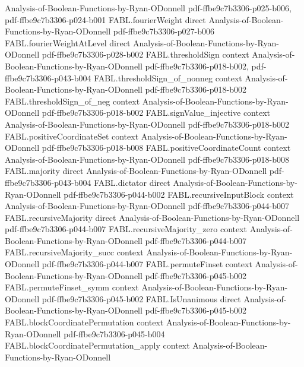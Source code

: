 \begin{theorem}
  {Analysis-of-Boolean-Functions-by-Ryan-ODonnell}
  {pdf-ffbe9c7b3306-p025-b006,
    pdf-ffbe9c7b3306-p024-b001}
\proofstep
  {FABL.fourierWeight}
  {direct}
  {Analysis-of-Boolean-Functions-by-Ryan-ODonnell}
  {pdf-ffbe9c7b3306-p027-b006}
\proofstep
  {FABL.fourierWeightAtLevel}
  {direct}
  {Analysis-of-Boolean-Functions-by-Ryan-ODonnell}
  {pdf-ffbe9c7b3306-p028-b002}
\proofstep
  {FABL.thresholdSign}
  {context}
  {Analysis-of-Boolean-Functions-by-Ryan-ODonnell}
  {pdf-ffbe9c7b3306-p018-b002,
    pdf-ffbe9c7b3306-p043-b004}
\proofstep
  {FABL.thresholdSign_of_nonneg}
  {context}
  {Analysis-of-Boolean-Functions-by-Ryan-ODonnell}
  {pdf-ffbe9c7b3306-p018-b002}
\proofstep
  {FABL.thresholdSign_of_neg}
  {context}
  {Analysis-of-Boolean-Functions-by-Ryan-ODonnell}
  {pdf-ffbe9c7b3306-p018-b002}
\proofstep
  {FABL.signValue_injective}
  {context}
  {Analysis-of-Boolean-Functions-by-Ryan-ODonnell}
  {pdf-ffbe9c7b3306-p018-b002}
\proofstep
  {FABL.positiveCoordinateSet}
  {context}
  {Analysis-of-Boolean-Functions-by-Ryan-ODonnell}
  {pdf-ffbe9c7b3306-p018-b008}
\proofstep
  {FABL.positiveCoordinateCount}
  {context}
  {Analysis-of-Boolean-Functions-by-Ryan-ODonnell}
  {pdf-ffbe9c7b3306-p018-b008}
\proofstep
  {FABL.majority}
  {direct}
  {Analysis-of-Boolean-Functions-by-Ryan-ODonnell}
  {pdf-ffbe9c7b3306-p043-b004}
\proofstep
  {FABL.dictator}
  {direct}
  {Analysis-of-Boolean-Functions-by-Ryan-ODonnell}
  {pdf-ffbe9c7b3306-p044-b002}
\proofstep
  {FABL.recursiveInputBlock}
  {context}
  {Analysis-of-Boolean-Functions-by-Ryan-ODonnell}
  {pdf-ffbe9c7b3306-p044-b007}
\proofstep
  {FABL.recursiveMajority}
  {direct}
  {Analysis-of-Boolean-Functions-by-Ryan-ODonnell}
  {pdf-ffbe9c7b3306-p044-b007}
\proofstep
  {FABL.recursiveMajority_zero}
  {context}
  {Analysis-of-Boolean-Functions-by-Ryan-ODonnell}
  {pdf-ffbe9c7b3306-p044-b007}
\proofstep
  {FABL.recursiveMajority_succ}
  {context}
  {Analysis-of-Boolean-Functions-by-Ryan-ODonnell}
  {pdf-ffbe9c7b3306-p044-b007}
\proofstep
  {FABL.permuteFinset}
  {context}
  {Analysis-of-Boolean-Functions-by-Ryan-ODonnell}
  {pdf-ffbe9c7b3306-p045-b002}
\proofstep
  {FABL.permuteFinset_symm}
  {context}
  {Analysis-of-Boolean-Functions-by-Ryan-ODonnell}
  {pdf-ffbe9c7b3306-p045-b002}
\proofstep
  {FABL.IsUnanimous}
  {direct}
  {Analysis-of-Boolean-Functions-by-Ryan-ODonnell}
  {pdf-ffbe9c7b3306-p045-b002}
\proofstep
  {FABL.blockCoordinatePermutation}
  {context}
  {Analysis-of-Boolean-Functions-by-Ryan-ODonnell}
  {pdf-ffbe9c7b3306-p045-b004}
\proofstep
  {FABL.blockCoordinatePermutation_apply}
  {context}
  {Analysis-of-Boolean-Functions-by-Ryan-ODonnell}

\end{theorem}

